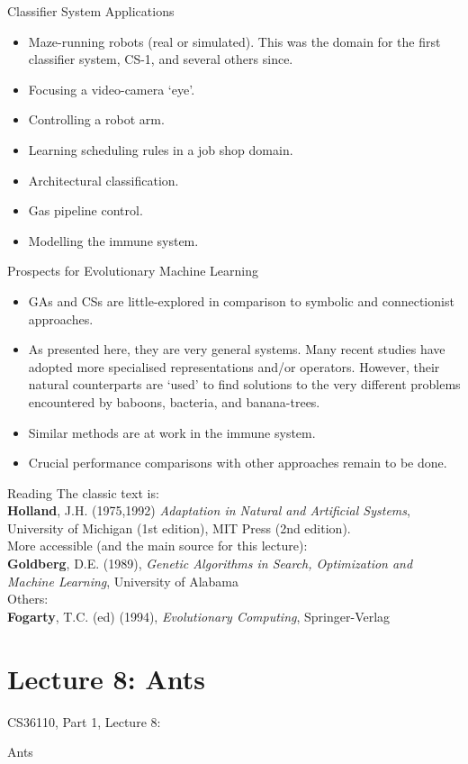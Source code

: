 \documentclass{article}
\begin{document}
\begin{slide}{}
{\Large Classifier System Applications}
\begin{itemize}
\item Maze-running robots (real or simulated). This was the domain for
the first classifier system, CS-1, and several others since.
\item Focusing a video-camera `eye'.
\item Controlling a robot arm.
\item Learning scheduling rules in a job shop domain.
\item Architectural classification.
\item Gas pipeline control.
\item Modelling the immune system.
\end{itemize}
\end{slide}

\begin{slide}{}
{\Large Prospects for Evolutionary Machine Learning}
\begin{itemize}
\item GAs and CSs are little-explored in comparison to symbolic and
connectionist approaches.
\item As presented here, they are very general systems. Many recent
studies have 
adopted more specialised representations and/or operators. However,
their natural counterparts are `used' to find solutions to the very
different problems
encountered by baboons, bacteria, and banana-trees. 
\item Similar methods
are at work in the immune system.
\item Crucial performance comparisons with other approaches remain
to be done.
\end{itemize}
\end{slide}

\begin{slide}{}
{\Large Reading}
{\small The classic text is:\\{\bf Holland}, J.H. (1975,1992)
{\em Adaptation in Natural and Artificial Systems},
University of Michigan (1st edition), MIT Press (2nd edition).\\More accessible (and the main source for this lecture):\\{\bf Goldberg}, D.E. (1989),
{\em Genetic Algorithms in Search, Optimization and Machine
Learning}, University of Alabama\\Others:\\{\bf Fogarty}, T.C. (ed) (1994),
{\em Evolutionary Computing}, Springer-Verlag}
\end{slide}\section{Lecture 8: Ants}
\begin{slide}{}
{\Large CS36110, Part 1, Lecture 8:}

{\Large Ants}

\end{slide}
\end{document}
